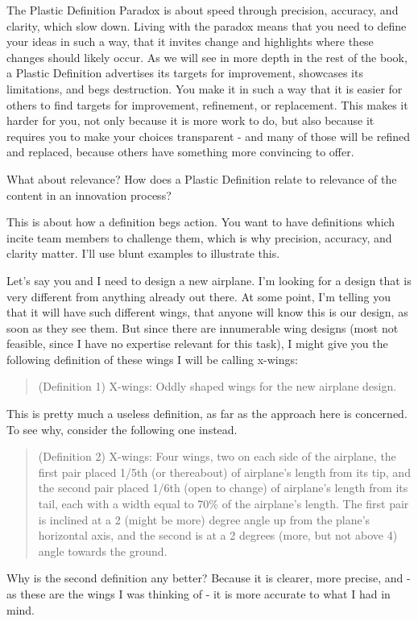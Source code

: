 \documentclass[graybox,envcountchap,sectrefs]{svmono}
\newcommand{\newterm}[1]{\begin{quote}\textsf{#1}\end{quote}}
\newcommand{\newdef}[1]{Plastic Definition}
\newcommand{\ndparadox}[1]{\newdef{} Paradox}
\begin{document}
The \ndparadox{} is about speed through precision, accuracy, and clarity, which slow down. Living with the paradox means that you need to define your ideas in such a way, that it invites change and highlights where these changes should likely occur. As we will see in more depth in the rest of the book, a \newdef{} advertises its targets for improvement, showcases its limitations, and begs destruction. You make it in such a way that it is easier for others to find targets for improvement, refinement, or replacement. This makes it harder for you, not only because it is more work to do, but also because it requires you to make your choices transparent - and many of those will be refined and replaced, because others have something more convincing to offer.

What about relevance? How does a \newdef{} relate to relevance of the content in an innovation process?

This is about how a definition begs action. You want to have definitions which incite team members to challenge them, which is why precision, accuracy, and clarity matter. I'll use blunt examples to illustrate this.

Let's say you and I need to design a new airplane. I'm looking for a design that is very different from anything already out there. At some point, I'm telling you that it will have such different wings, that anyone will know this is our design, as soon as they see them. But since there are innumerable wing designs (most not feasible, since I have no expertise relevant for this task), I might give you the following definition of these wings I will be calling x-wings:

\newterm{
(Definition 1) 
X-wings: Oddly shaped wings for the new airplane design.
}

This is pretty much a useless definition, as far as the approach here is concerned. To see why, consider the following one instead.

\newterm{
(Definition 2) 
X-wings: Four wings, two on each side of the airplane, the first pair placed 1/5th (or thereabout) of airplane's length from its tip, and the second pair placed 1/6th (open to change) of airplane's length from its tail, each with a width equal to 70\% of the airplane's length. The first pair is inclined at a 2 (might be more) degree angle up from the plane's horizontal axis, and the second is at a 2 degrees (more, but not above 4) angle towards the ground.
}

Why is the second definition any better? Because it is clearer, more precise, and - as these are the wings I was thinking of - it is more accurate to what I had in mind. 
\end{document}
